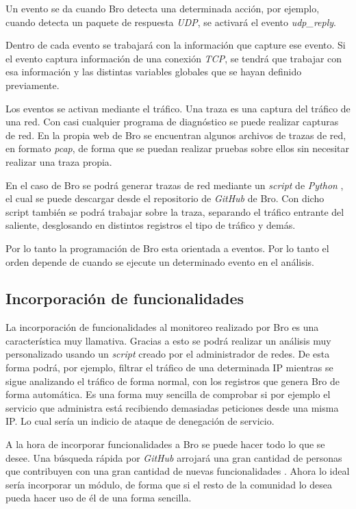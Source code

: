 Un evento se da cuando Bro detecta una determinada acción, por ejemplo, cuando detecta un paquete de respuesta \textit{UDP}, se 
activará el evento \textit{udp_reply}.

\intro Dentro de cada evento se trabajará con la información que capture ese evento. Si el evento captura información de una conexión 
\textit{TCP}, se tendrá que trabajar con esa información y las distintas variables globales que se hayan definido previamente.

\intro Los eventos se activan mediante el tráfico. Una traza es una captura del tráfico de una red. Con casi cualquier programa de 
diagnóstico se puede realizar capturas de red. En la propia web de Bro se encuentran algunos archivos de trazas de red, en 
formato \textit{pcap}, de forma que se puedan realizar pruebas sobre ellos sin necesitar realizar una 
traza propia.

\intro En el caso de Bro se podrá generar trazas de red mediante un \textit{script} de \textit{Python}
\cite{brotrace}, el cual se puede descargar desde el repositorio de \textit{GitHub} de Bro. Con dicho script también 
se podrá trabajar sobre la traza, separando el tráfico entrante del saliente, desglosando en distintos registros 
el tipo de tráfico y demás.

\intro Por lo tanto la programación de Bro esta orientada a eventos. Por lo tanto el orden depende de cuando se ejecute un determinado evento en el análisis.


\subsection{Incorporación de funcionalidades}

La incorporación de funcionalidades al monitoreo realizado por Bro es una característica muy llamativa. Gracias 
a esto se podrá realizar un análisis muy personalizado usando un \textit{script} creado por el administrador de redes. De 
esta forma podrá, por ejemplo, filtrar el tráfico de una determinada IP mientras se sigue analizando el tráfico 
de forma normal, con los registros que genera Bro de forma automática. Es una forma muy sencilla de comprobar 
si por ejemplo el servicio que administra está recibiendo demasiadas peticiones desde una misma IP. Lo cual 
sería un indicio de ataque de denegación de servicio.

\intro A la hora de incorporar funcionalidades a Bro se puede hacer todo lo que se desee. Una búsqueda rápida 
por \textit{GitHub} arrojará una gran cantidad de personas que contribuyen con una gran cantidad de nuevas 
funcionalidades \citep{gitbeacon}. Ahora lo ideal sería incorporar un módulo, de forma que si el resto 
de la comunidad lo desea pueda hacer uso de él de una forma sencilla.

